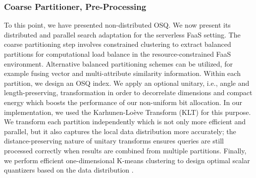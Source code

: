 \subsubsection{Coarse Partitioner, Pre-Processing}
To this point, we have presented non-distributed OSQ. We now present its distributed and parallel search adaptation for the serverless FaaS setting.
The coarse partitioning step involves 
constrained clustering to extract balanced partitions for computational load balance in the resource-constrained FaaS environment. 
Alternative balanced partitioning schemes can be utilized, for example fusing vector and multi-attribute similarity information.
Within each partition, we design an OSQ index. We apply an optional unitary, i.e., angle and length-preserving, transformation in order to decorrelate dimensions and 
compact energy which boosts the performance of our non-uniform bit allocation. In our implementation, we used the Karhunen-Loève Transform (KLT) for this purpose.
We transform each partition independently which is not only more efficient and parallel, but it also captures the local data distribution more accurately; the distance-preserving nature of unitary transforms ensures queries are still processed correctly when results are combined from multiple partitions.
Finally, we perform efficient one-dimensional K-means clustering to design optimal scalar quantizers based on the data distribution \cite{LloydsAlgorithm1982}. 




